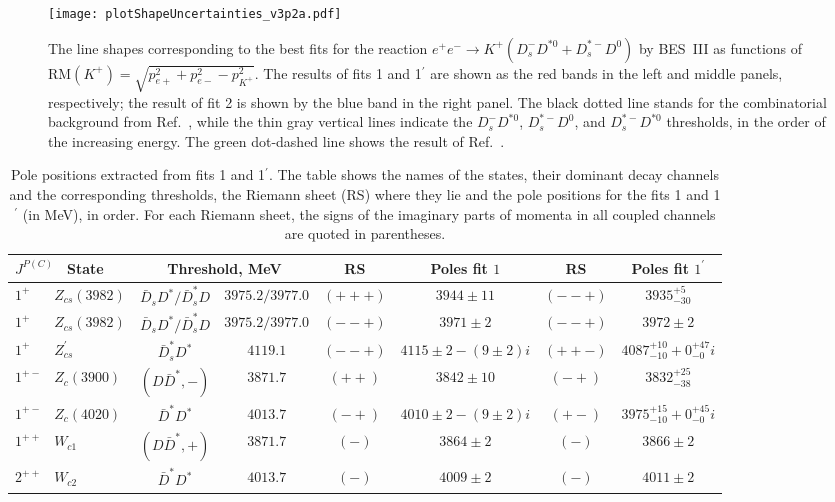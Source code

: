 \documentclass[preprint,12pt,3p]{elsarticle}
\begin{document}
\begin{figure}[t!]
\texttt{[image: plotShapeUncertainties\_v3p2a.pdf]} 
\caption{The line shapes corresponding to the best fits for the reaction $e^+e^- \to K^+(D_s^-D^{*0}+{D}_s^{*-}D^0)$ by BES~III \cite{BESIII:2020qkh} as functions of $\mbox{RM}(K^+)= \sqrt{p_{e+}^2+p_{e-}^2-p_{K^+}^2}$.
The results of fits 1 and 1$^\prime$ are shown as the red bands in the left and middle panels, respectively; the result of fit 2 is shown by the blue band in the right panel. The black dotted line stands for the combinatorial background from Ref.~\cite{BESIII:2020qkh}, while the thin gray vertical lines indicate the $D_s^-D^{*0}$, ${D}_s^{*-}D^0$, and $D^{*-}_sD^{*0} $ thresholds, in the order of the increasing energy. 
The green dot-dashed line shows the result of Ref.~\cite{Yang:2020nrt}. \label{Line_shape}}
\end{figure}

\begin{table}[tb]
\begin{adjustbox}{width=1.0\columnwidth}
\begin{tabular}{|l |cc | c c | c c| }
\hline 
\hline
$J^{P(C)}$ $\,$ State & \multicolumn{2}{c|}{Threshold, MeV} & RS & Poles fit $1$ & RS & Poles fit $1^\prime$
\\
\hline 
\hline
$1^{+\phantom{-}}$ $\,$ $Z_{cs}(3982)$ & $\bar{D}_s D^*/ \bar{D}_s^* D$ & $3975.2/3977.0$ & $(+++)$ & $3944\pm11$ & $(--+)$ & $3935_{-30}^{+5}$
\\
\hline 
$1^{+\phantom{-}}$ $\,$ $Z_{cs}(3982)$ & $\bar{D}_s D^*/ \bar{D}_s^* D$ & $3975.2/3977.0$ & $(--+)$ & $3971\pm2$ & $(--+)$ & $3972\pm2$
\\
\hline
$1^{+\phantom{-}}$ $\,$ $Z_{cs}^{\prime}$ & $\bar{D}_s^* D^*$ & $4119.1$ & $(--+)$ & $4115\pm2 -(9\pm2)i$ &$(++-)$& $ 4087_{-10}^{+10}+ 0_{-0}^{+47}i$
\\
\hline
\hline
$1^{+-}$ $\,$ $Z_c(3900)$ & $(D\bar D^*,-)$ & $3871.7$ & $(++)$ & $3842\pm10$ & $(-+)$ & $3832_{-38}^{+25}$ 
\\
\hline
$1^{+-}$ $\,$ $Z_c(4020)$ & $\bar{D}^* D^*$ & $4013.7$ & $(-+)$ & $4010\pm2 - (9\pm2) i$ & $(+-)$ & $3975_{-10}^{+15} + 0^{+45}_{-0}i $
\\
\hline
\hline
$1^{++}$ $\,$ $W_{c1}$ & $(D\bar D^*,+)$ & $3871.7$ & $(-)$ & $3864\pm2$ & $(-)$ & $3866\pm2$
\\
\hline
\hline
 $2^{++}$ $\,$ $W_{c2}$ & $\bar{D}^* D^*$ & $4013.7$ & $(-)$ & $4009\pm2$ & $(-)$ & $4011\pm2$
\\
\hline
\hline
\end{tabular}
\end{adjustbox}
\caption{Pole positions extracted from fits 1 and 1$^\prime$. The table shows the names of the states, their dominant decay channels and the corresponding thresholds, the Riemann sheet (RS) where they lie and the pole positions for the fits 1 and 1$^\prime$ (in MeV), in order. For each Riemann sheet, the signs of the imaginary parts of momenta in all coupled channels are quoted in parentheses.}
\label{tab:poles}
\end{table}
\end{document}
